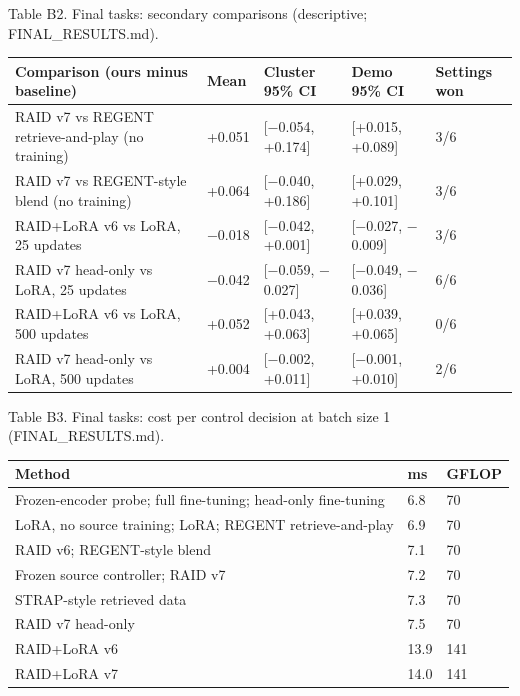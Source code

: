 \documentclass[11pt,a4paper]{article}
\begin{document}
Table B2. Final tasks: secondary comparisons (descriptive; FINAL\_RESULTS.md).

{\def\LTcaptype{none} %
{\small
\begin{longtable}[]{@{}lllll@{}}
\toprule\noalign{}
Comparison (ours minus baseline) & Mean & Cluster 95\% CI & Demo 95\% CI & Settings won \\
\midrule\noalign{}
\endhead
\bottomrule\noalign{}
\endlastfoot
RAID v7 vs REGENT retrieve-and-play (no training) & +0.051 & {[}\ensuremath{-}0.054, +0.174{]} & {[}+0.015, +0.089{]} & 3/6 \\
RAID v7 vs REGENT-style blend (no training) & +0.064 & {[}\ensuremath{-}0.040, +0.186{]} & {[}+0.029, +0.101{]} & 3/6 \\
RAID+LoRA v6 vs LoRA, 25 updates & \ensuremath{-}0.018 & {[}\ensuremath{-}0.042, +0.001{]} & {[}\ensuremath{-}0.027, \ensuremath{-}0.009{]} & 3/6 \\
RAID v7 head-only vs LoRA, 25 updates & \ensuremath{-}0.042 & {[}\ensuremath{-}0.059, \ensuremath{-}0.027{]} & {[}\ensuremath{-}0.049, \ensuremath{-}0.036{]} & 6/6 \\
RAID+LoRA v6 vs LoRA, 500 updates & +0.052 & {[}+0.043, +0.063{]} & {[}+0.039, +0.065{]} & 0/6 \\
RAID v7 head-only vs LoRA, 500 updates & +0.004 & {[}\ensuremath{-}0.002, +0.011{]} & {[}\ensuremath{-}0.001, +0.010{]} & 2/6 \\
\end{longtable}
}
}

Table B3. Final tasks: cost per control decision at batch size 1 (FINAL\_RESULTS.md).

{\def\LTcaptype{none} %
{\small
\begin{longtable}[]{@{}lll@{}}
\toprule\noalign{}
Method & ms & GFLOP \\
\midrule\noalign{}
\endhead
\bottomrule\noalign{}
\endlastfoot
Frozen-encoder probe; full fine-tuning; head-only fine-tuning & 6.8 & 70 \\
LoRA, no source training; LoRA; REGENT retrieve-and-play & 6.9 & 70 \\
RAID v6; REGENT-style blend & 7.1 & 70 \\
Frozen source controller; RAID v7 & 7.2 & 70 \\
STRAP-style retrieved data & 7.3 & 70 \\
RAID v7 head-only & 7.5 & 70 \\
RAID+LoRA v6 & 13.9 & 141 \\
RAID+LoRA v7 & 14.0 & 141 \\
\end{longtable}
}
}
\end{document}
